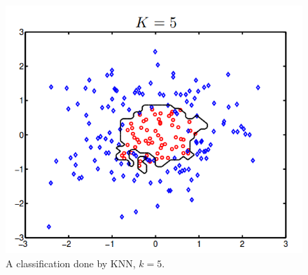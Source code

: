 \begin{figure}[h!]
\centering
\includegraphics[scale=0.3]{fig/KNN.png}
\caption{A classification done by KNN, $k = 5$.}
\label{fig:knn}
\end{figure}

